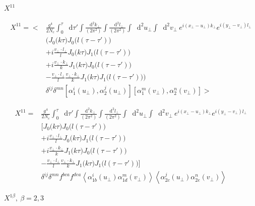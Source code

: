 \documentclass[12pt]{article}
\newcommand*\diff{\mathop{}\!\mathrm{d}}
\begin{document}
$X^{11}$ 

\begin{equation*}
\begin{split}
 X^{11} = \Bigg< &
\frac{g^4}{2 N_c}
\int_0^\tau \diff \tau'
\int \frac{\diff^2 k_\perp}{(2\pi^2)}
\int \frac{\diff^2 l_\perp}{(2\pi^2)}
\int \diff^2 u_\perp
\int \diff^2 v_\perp ~
e^{i (x_\perp - u_\perp) k_\perp}
e^{i (y_\perp - v_\perp) l_\perp} \\
& \bigg( J_0\big(k \tau \big) J_0\big(l(\tau-\tau')\big) \\
& +i \frac{v_\perp \cdot l_\perp}{l} J_0\big(k \tau \big) J_1\big(l(\tau-\tau')\big) \\
& +i \frac{v_\perp \cdot k_\perp}{k} J_1\big(k \tau \big) J_0\big(l(\tau-\tau')\big) \\
& - \frac{v_\perp \cdot l_\perp}{l} \frac{v_\perp \cdot k_\perp}{k} J_1\big(k \tau \big) J_1\big(l(\tau-\tau')\big)
\bigg) \\
& \delta^{ij} \delta^{mn} \left[\alpha^i_1 (u_\perp), \alpha_2^j (u_\perp) \right] \left[\alpha^m_1 (v_\perp), \alpha_2^n (v_\perp) \right]\Bigg>
\end{split}
\end{equation*}

\begin{equation*}
\begin{split}
 X^{11} = & 
\frac{g^4}{2 N_c}
\int_0^\tau \diff \tau'
\int \frac{\diff^2 k_\perp}{(2\pi^2)}
\int \frac{\diff^2 l_\perp}{(2\pi^2)}
\int \diff^2 u_\perp
\int \diff^2 v_\perp ~
e^{i (x_\perp - u_\perp) k_\perp}
e^{i (y_\perp - v_\perp) l_\perp} \\
& \bigg[ J_0\big(k \tau \big) J_0\big(l(\tau-\tau')\big) \\
& +i \frac{v_\perp \cdot l_\perp}{l} J_0\big(k \tau \big) J_1\big(l(\tau-\tau')\big) \\
& +i \frac{v_\perp \cdot k_\perp}{k} J_1\big(k \tau \big) J_0\big(l(\tau-\tau')\big) \\
& - \frac{v_\perp \cdot l_\perp}{l} \frac{v_\perp \cdot k_\perp}{k} J_1\big(k \tau \big) J_1\big(l(\tau-\tau')\big)
\bigg] \\
& \delta^{ij} \delta^{mn} f^{bca} f^{dea}
\left< \alpha^i_{1b} (u_\perp) \alpha^m_{1d} (v_\perp) \right>  \left< \alpha^j_{2c} (u_\perp) \alpha^n_{2e} (v_\perp) \right> 
\end{split}
\end{equation*}

\newpage

$X^{1 \beta}, ~ \beta=2,3$
\end{document}
